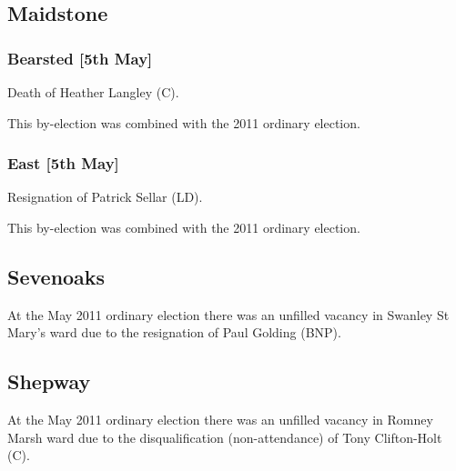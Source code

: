 \begin{resultsiii}
\subsection*{Maidstone}

\subsubsection*{Bearsted \hspace*{\fill}\nolinebreak[1]%
\enspace\hspace*{\fill}
[5th May]}


Death of Heather Langley (C).

This by-election was combined with the 2011 ordinary election.

\subsubsection*{East \hspace*{\fill}\nolinebreak[1]%
\enspace\hspace*{\fill}
[5th May]}


Resignation of Patrick Sellar (LD).

This by-election was combined with the 2011 ordinary election.

\subsection*{Sevenoaks}


At the May 2011 ordinary election there was an unfilled vacancy in Swanley St Mary's ward due to the resignation of Paul Golding (BNP).

\subsection*{Shepway}


At the May 2011 ordinary election there was an unfilled vacancy in Romney Marsh ward due to the disqualification (non-attendance) of Tony Clifton-Holt (C).


\end{resultsiii}
